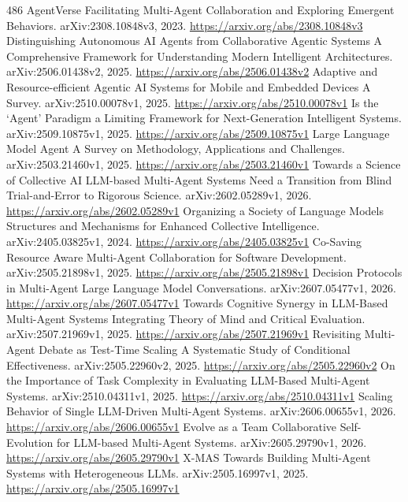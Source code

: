 \documentclass[11pt]{article}
\begin{document}
\begin{thebibliography}{486}
 AgentVerse Facilitating Multi-Agent Collaboration and Exploring Emergent Behaviors. arXiv:2308.10848v3, 2023. \url{https://arxiv.org/abs/2308.10848v3}
 Distinguishing Autonomous AI Agents from Collaborative Agentic Systems A Comprehensive Framework for Understanding Modern Intelligent Architectures. arXiv:2506.01438v2, 2025. \url{https://arxiv.org/abs/2506.01438v2}
 Adaptive and Resource-efficient Agentic AI Systems for Mobile and Embedded Devices A Survey. arXiv:2510.00078v1, 2025. \url{https://arxiv.org/abs/2510.00078v1}
 Is the `Agent' Paradigm a Limiting Framework for Next-Generation Intelligent Systems. arXiv:2509.10875v1, 2025. \url{https://arxiv.org/abs/2509.10875v1}
 Large Language Model Agent A Survey on Methodology, Applications and Challenges. arXiv:2503.21460v1, 2025. \url{https://arxiv.org/abs/2503.21460v1}
 Towards a Science of Collective AI LLM-based Multi-Agent Systems Need a Transition from Blind Trial-and-Error to Rigorous Science. arXiv:2602.05289v1, 2026. \url{https://arxiv.org/abs/2602.05289v1}
 Organizing a Society of Language Models Structures and Mechanisms for Enhanced Collective Intelligence. arXiv:2405.03825v1, 2024. \url{https://arxiv.org/abs/2405.03825v1}
 Co-Saving Resource Aware Multi-Agent Collaboration for Software Development. arXiv:2505.21898v1, 2025. \url{https://arxiv.org/abs/2505.21898v1}
 Decision Protocols in Multi-Agent Large Language Model Conversations. arXiv:2607.05477v1, 2026. \url{https://arxiv.org/abs/2607.05477v1}
 Towards Cognitive Synergy in LLM-Based Multi-Agent Systems Integrating Theory of Mind and Critical Evaluation. arXiv:2507.21969v1, 2025. \url{https://arxiv.org/abs/2507.21969v1}
 Revisiting Multi-Agent Debate as Test-Time Scaling A Systematic Study of Conditional Effectiveness. arXiv:2505.22960v2, 2025. \url{https://arxiv.org/abs/2505.22960v2}
 On the Importance of Task Complexity in Evaluating LLM-Based Multi-Agent Systems. arXiv:2510.04311v1, 2025. \url{https://arxiv.org/abs/2510.04311v1}
 Scaling Behavior of Single LLM-Driven Multi-Agent Systems. arXiv:2606.00655v1, 2026. \url{https://arxiv.org/abs/2606.00655v1}
 Evolve as a Team Collaborative Self-Evolution for LLM-based Multi-Agent Systems. arXiv:2605.29790v1, 2026. \url{https://arxiv.org/abs/2605.29790v1}
 X-MAS Towards Building Multi-Agent Systems with Heterogeneous LLMs. arXiv:2505.16997v1, 2025. \url{https://arxiv.org/abs/2505.16997v1}

\end{thebibliography}
\end{document}
